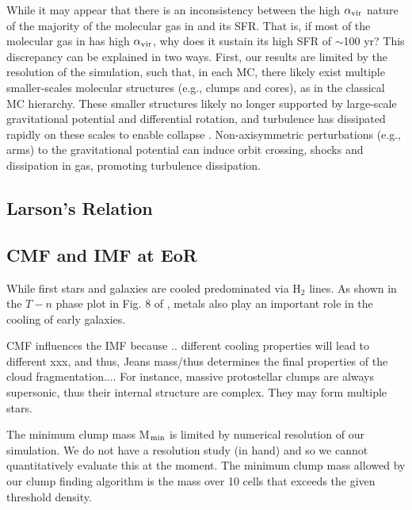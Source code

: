 \documentclass[apj]{emulateapj} %
\begin{document}
While it may appear that there is an inconsistency between the high $\alpha_{\rm vir}$ 
nature of the majority of the molecular gas in \flower and its SFR. 
That is, if most of the molecular gas in \flower has high $\alpha_{\rm vir}$, why does it sustain its high SFR of $\sim$100\,\Msun\,yr\pmOne?
This discrepancy can be explained in two ways. 
First, our results are limited by the resolution of the simulation, such that, in each MC, there 
likely exist multiple smaller-scales molecular structures (e.g., clumps and cores), 
as in the classical MC hierarchy. These smaller structures likely no longer supported by large-scale gravitational potential and differential rotation, 
and turbulence has dissipated rapidly on these scales to enable collapse \citep{Clark04a}.
Non-axisymmetric perturbations (e.g., arms) to the gravitational potential 
can induce orbit crossing, shocks and dissipation in gas, promoting turbulence dissipation.


\subsection{Larson's Relation}

\subsection{CMF and IMF at EoR}



While first stars and galaxies are cooled predominated via H$_2$ lines. 
As shown in the $T-n$ phase plot in Fig. 8 of \citealt{Pallottini17b}, metals also play an important role in the cooling of early galaxies.


CMF influences the IMF because .. different cooling properties will lead to different xxx, and thus, Jeans mass/thus determines the final properties of the cloud fragmentation....  For instance, massive protostellar clumps are always supersonic, thus their internal structure are complex. They may form multiple stars.


The minimum clump mass M$_{\rm min}$ is limited by numerical resolution of our simulation. We do not have a resolution study (in hand) and so we cannot quantitatively evaluate this at the moment. The minimum clump mass allowed 
by our clump finding algorithm is the mass over 10 cells that exceeds the given threshold density.



\end{document}
